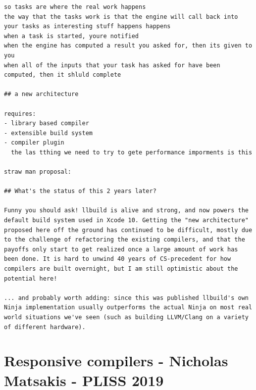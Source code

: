 \documentclass[12pt, a4paper]{report}
\begin{document}
\begin{verbatim}
so tasks are where the real work happens
the way that the tasks work is that the engine will call back into
your tasks as interesting stuff happens happens
when a task is started, youre notified
when the engine has computed a result you asked for, then its given to
you
when all of the inputs that your task has asked for have been
computed, then it shluld complete

## a new architecture

requires:
- library based compiler
- extensible build system
- compiler plugin
  the las tthing we need to try to gete performance imporments is this

straw man proposal:

## What's the status of this 2 years later?

Funny you should ask! llbuild is alive and strong, and now powers the
default build system used in Xcode 10. Getting the "new architecture"
proposed here off the ground has continued to be difficult, mostly due
to the challenge of refactoring the existing compilers, and that the
payoffs only start to get realized once a large amount of work has
been done. It is hard to unwind 40 years of CS-precedent for how
compilers are built overnight, but I am still optimistic about the
potential here!

... and probably worth adding: since this was published llbuild's own
Ninja implementation usually outperforms the actual Ninja on most real
world situations we've seen (such as building LLVM/Clang on a variety
of different hardware).
\end{verbatim}

\section*{Responsive compilers - Nicholas Matsakis - PLISS 2019}
\cite{niko2019responsive}
\end{document}
